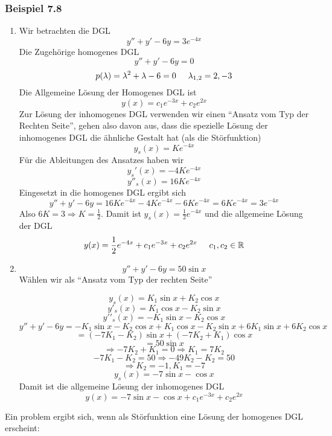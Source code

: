 \subsubsection*{Beispiel 7.8}
\begin{enumerate}
\item Wir betrachten die DGL \[y''+y'-6y=3e^{-4x}\]Die Zugehörige homogenes DGL \[y''+y'-6y=0\]
\[p(\lambda)=\lambda^2+\lambda-6=0\text{\hspace{5mm}}\lambda_{1,2}=2,-3\] Die Allgemeine Lösung der Homogenes DGL ist \[y(x)=c_1e^{-3x}+c_2e^{2x}\] Zur Lösung der inhomogenes DGL verwenden wir einen ``Ansatz vom Typ der Rechten Seite'', gehen also davon aus, dass die spezielle Lösung der inhomogenes DGL die ähnliche Gestalt hat (als die Störfunktion) \[y_s(x)=Ke^{-4x}\]Für die Ableitungen des Ansatzes haben wir \[y_s'(x)=-4Ke^{-4x}\]
\[y''_s(x)=16Ke^{-4x}\]Eingesetzt in die homogenes DGL ergibt sich \[y''+y'-6y=16Ke^{-4x}-4Ke^{-4x}-6Ke^{-4x}=6Ke^{-4x}=3e^{-4x}\]Also $6K=3\Rightarrow K=\frac{1}{2}$. Damit ist $y_s(x)=\frac{1}{2}e^{-4x}$ und die allgemeine Lösung der DGL \[y(x)=\frac{1}{2}e^{-4x}+c_1e^{-3x}+c_2e^{2x}\text{\hspace{5mm}}c_1,c_2\in\mathbb{R}\]
\item \[y''+y'-6y=50\sin x\] Wählen wir als ``Ansatz vom Typ der rechten Seite''

\[{y_s}(x) = {K_1}\sin x + {K_2}\cos x\]
\[y{'_s}(x) = {K_1}\cos x - {K_2}\sin x\]
\[y'{'_s}(x) =  - {K_1}\sin x - {K_2}\cos x\]
\[y'' + y' - 6y =  - {K_1}\sin x - {K_2}\cos x + {K_1}\cos x - {K_2}\sin x + 6{K_1}\sin x + 6{K_2}\cos x\]
\[ = ( - 7{K_1} - {K_2})\sin x + ( - 7{K_2} + {K_1})\cos x\]
\[ = 50\sin x\]
\[ \Rightarrow  - 7{K_2} + {K_1} = 0 \Rightarrow {K_1} = 7{K_2}\]
\[ - 7{K_1} - {K_2} = 50 \Rightarrow  - 49{K_2} - {K_2} = 50\]
\[ \Rightarrow {K_2} =  - 1,{K_1} =  - 7\]
\[y_s(x)=-7\sin x-\cos x\]
Damit ist die allgemeine Lösung der inhomogenes DGL \[y(x)=-7\sin x-\cos x+c_1e^{-3x}+c_2e^{2x}\]
\end{enumerate}
Ein problem ergibt sich, wenn als Störfunktion eine Lösung der homogenes DGL erscheint:
